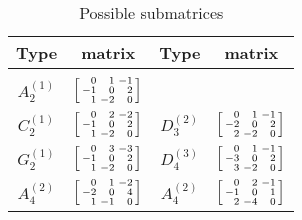 \documentclass{amsart}
\theoremstyle{definition}
\theoremstyle{remark}
\numberwithin{equation}{section}
\newcommand{\0}{{\mathbf{0}}}
\begin{document}
	\begin{table}
	\caption{Possible submatrices}
	\label{submat tab}	
	\begin{tabular}{|cc|cc|}
	Type & matrix & Type & matrix \\
	\hline & & & \\[-1ex]
	$A_{2}^{(1)}$ & $\begin{bsmallmatrix*}[r]
	0 & 1 & -1 \\
	-1 & 0 & 2 \\
	1 & -2 & 0
	\end{bsmallmatrix*}$ & & \\[4ex]
	$C_{2}^{(1)}$ & $\begin{bsmallmatrix*}[r]
	0 & 2 & -2 \\
	-1 & 0 & 2 \\
	1 & -2 & 0
	\end{bsmallmatrix*}$ &
	$D_{3}^{(2)}$ & $\begin{bsmallmatrix*}[r]
	0 & 1 & -1 \\
	-2 & 0 & 2 \\
	2 & -2 & 0
	\end{bsmallmatrix*}$ \\[4ex]
	$G_2^{(1)}$ & $\begin{bsmallmatrix*}[r]
	0 & 3 & -3 \\
	-1 & 0 & 2 \\
	1 & -2 & 0
	\end{bsmallmatrix*}$ &
	$D_4^{(3)}$ & $\begin{bsmallmatrix*}[r]
	0 & 1 & -1 \\
	-3 & 0 & 2 \\
	3 & -2 & 0
	\end{bsmallmatrix*}$ \\[4ex]
	$A_{4}^{(2)}$ & $\begin{bsmallmatrix*}[r]
	0 & 1 & -2 \\
	-2 & 0 & 4 \\
	1 & -1 & 0
	\end{bsmallmatrix*}$ &
	$A_{4}^{(2)}$ & $\begin{bsmallmatrix*}[r]
	0 & 2 & -1 \\
	-1 & 0 & 1 \\
	2 & -4 & 0
	\end{bsmallmatrix*}$ 
	\end{tabular}
	\end{table}
\end{document}
